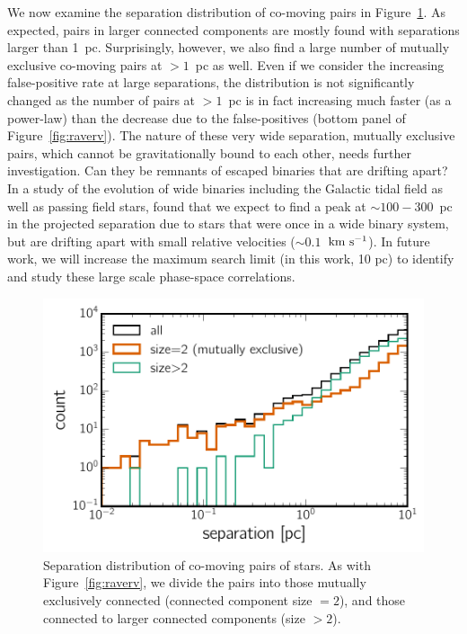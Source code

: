 \documentclass[manuscript, letterpaper]{aastex6}
\newcommand{\kms}{\ensuremath{\rm km~s^{-1}}}
\begin{document}
We now examine the separation distribution of co-moving pairs in
Figure~\ref{fig:hist_separation}.
As expected, pairs in larger connected components are mostly
found with separations larger than 1~pc.
Surprisingly, however, we also find a large number of mutually exclusive co-moving
pairs
at $>1$~pc as well. Even if we consider the increasing false-positive rate at large
separations, the distribution is not significantly changed as the number of pairs
at $>1$~pc is in fact increasing much faster (as a power-law)
than the decrease due to the false-positives
(bottom panel of Figure~\ref{fig:raverv}).
The nature of these very wide separation, mutually exclusive pairs,
which cannot be gravitationally bound to each other, needs further investigation.
Can they be remnants of escaped binaries that are drifting apart?
In a study of the evolution of wide binaries including the Galactic tidal field
as well as passing field stars, \citet{Jiang:2010aa} found that we expect
to find a peak at $\sim 100-300$~pc in the projected separation due to
stars that were once in a wide binary system, but are drifting apart with small
relative velocities ($\sim 0.1$~\kms).
In future work, we will increase the maximum search limit (in this work, 10 pc)
to identify and study these large scale phase-space correlations.

\begin{figure}[htbp]
  \begin{center}
    \includegraphics[width=\textwidth]{figures/hist_sep.pdf}
  \end{center}
  \caption{%
    Separation distribution of co-moving pairs of stars.
    As with Figure~\ref{fig:raverv},
    we divide the pairs into those mutually exclusively connected
    (connected component size $=2$), and those connected to larger connected components (size $>2$).
    \label{fig:hist_separation}
    }
\end{figure}
\end{document}
